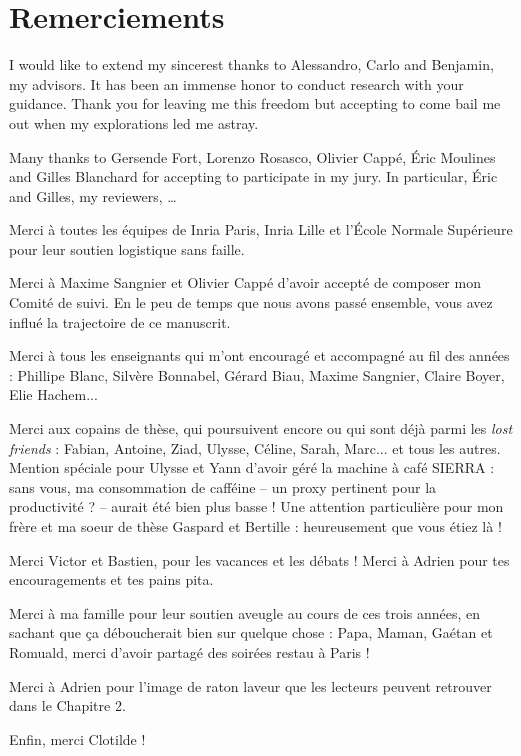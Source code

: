 \chapter{Remerciements}

I would like to extend my sincerest thanks to Alessandro, Carlo and Benjamin, my advisors. It has been an immense honor to conduct research with your guidance. Thank you for leaving me this freedom but accepting to come bail me out when my explorations led me astray.

Many thanks to Gersende Fort, Lorenzo Rosasco, Olivier Cappé, Éric Moulines and Gilles Blanchard for accepting to participate in my jury. In particular, Éric and Gilles, my reviewers, \ldots


Merci à toutes les équipes de Inria Paris, Inria Lille et l'École Normale Supérieure pour leur soutien logistique sans faille.

Merci à Maxime Sangnier et Olivier Cappé d'avoir accepté de composer mon Comité de suivi. En le peu de temps que nous avons passé ensemble, vous avez influé la trajectoire de ce manuscrit.

Merci à tous les enseignants qui m'ont encouragé et accompagné au fil des années : Phillipe Blanc, Silvère Bonnabel, Gérard Biau, Maxime Sangnier, Claire Boyer, Elie Hachem...

Merci aux copains de thèse, qui poursuivent encore ou qui sont déjà parmi les \emph{lost friends} : Fabian, Antoine, Ziad, Ulysse, Céline, Sarah, Marc... et tous les autres. Mention spéciale pour Ulysse et Yann d'avoir géré la machine à café SIERRA : sans vous, ma consommation de cafféine -- un proxy pertinent pour la productivité ? -- aurait été bien plus basse ! Une attention particulière pour mon frère et ma soeur de thèse Gaspard et Bertille : heureusement que vous étiez là !

Merci Victor et Bastien, pour les vacances et les débats ! Merci à Adrien pour tes encouragements et tes pains pita.

Merci à ma famille pour leur soutien aveugle au cours de ces trois années, en sachant que ça déboucherait bien sur quelque chose : Papa, Maman, Gaétan et Romuald, merci d'avoir partagé des soirées restau à Paris !

Merci à Adrien pour l'image de raton laveur que les lecteurs peuvent retrouver dans le Chapitre 2.

Enfin, merci Clotilde !

